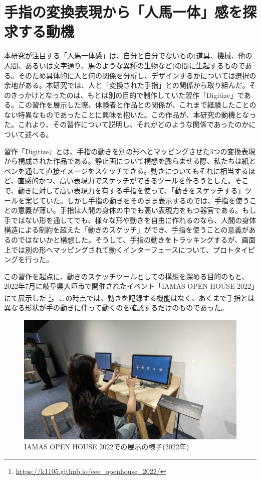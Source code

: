 \section{手指の変換表現から「人馬一体」感を探求する動機}
\label{prototyping_concept_making}
本研究が注目する「人馬一体感」は、自分と自分でないもの(道具、機械、他の人間、あるいは文字通り、馬のような異種の生物など)の間に生起するものである。そのため具体的に人と何の関係を分析し、デザインするかについては選択の余地がある。本研究では、人と「変換された手指」との関係から取り組んだ。そのきっかけとなったのは、もとは別の目的で制作していた習作「Digitize」である。この習作を展示した際、体験者と作品との関係が、これまで経験したことのない特異なものであったことに興味を抱いた。この作品が、本研究の動機となった。これより、その習作について説明し、それがどのような関係であったのかについて述べる。

習作「Digitize」とは、手指の動きを別の形へとマッピングさせた3つの変換表現から構成された作品である。静止画について構想を膨らませる際、私たちは紙とペンを通して直接イメージをスケッチできる。動きについてもそれに相当するほど、直感的かつ、高い表現力でスケッチができるツールを作ろうとした。そこで、動きに対して高い表現力を有する手指を使って、「動きをスケッチする」ツールを案じていた。しかし手指の動きをそのまま表示するのでは、手指を使うことの意義が薄い。手指は人間の身体の中でも高い表現力をもつ器官である。もし手ではない形を通してでも、様々な形や動きを自由に作れるのなら、人間の身体構造による制約を超えた「動きのスケッチ」ができ、手指を使うことの意義があるのではないかと構想した。そうして、手指の動きをトラッキングするが、画面上では別の形へマッピングされて動くインターフェースについて、プロトタイピングを行った。

この習作を起点に、動きのスケッチツールとしての構想を深める目的のもと、2022年7月に岐阜県大垣市で開催されたイベント「IAMAS OPEN HOUSE 2022」にて展示した \footnote{\url{https://k1105.github.io/eee_openhouse_2022/}}。この時点では、動きを記録する機能はなく、あくまで手指とは異なる形状が手の動きに伴って動くのを確認するだけのものであった。

\begin{figure}[H]
  \centering
  \includegraphics[width=15cm]{img/openhouse2022.jpeg}
  \caption{IAMAS OPEN HOUSE 2022での展示の様子(2022年)}
  \label{fig:exhibit_2022}
\end{figure}

